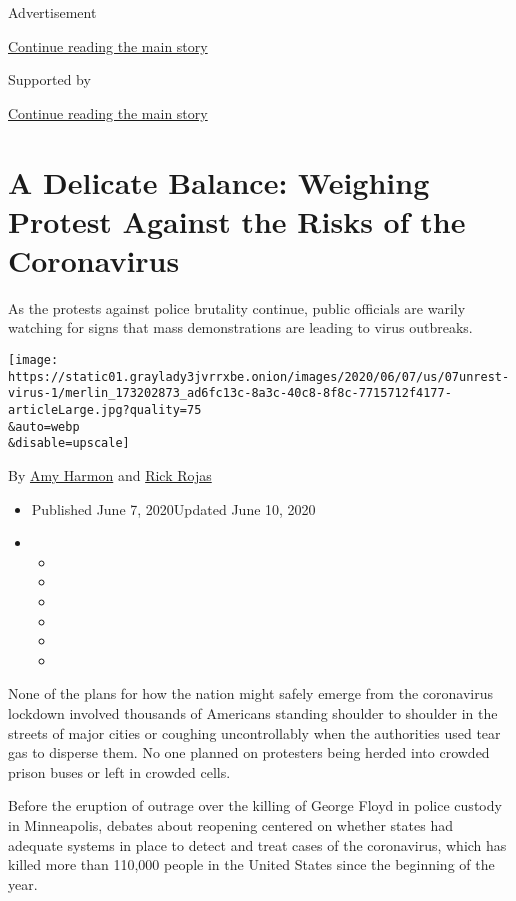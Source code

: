 Advertisement

\protect\hyperlink{after-top}{Continue reading the main story}

Supported by

\protect\hyperlink{after-sponsor}{Continue reading the main story}

\hypertarget{a-delicate-balance-weighing-protest-against-the-risks-of-the-coronavirus}{%
\section{A Delicate Balance: Weighing Protest Against the Risks of the
Coronavirus}\label{a-delicate-balance-weighing-protest-against-the-risks-of-the-coronavirus}}

As the protests against police brutality continue, public officials are
warily watching for signs that mass demonstrations are leading to virus
outbreaks.

\texttt{[image: https://static01.graylady3jvrrxbe.onion/images/2020/06/07/us/07unrest-virus-1/merlin\_173202873\_ad6fc13c-8a3c-40c8-8f8c-7715712f4177-articleLarge.jpg?quality=75\\\&auto=webp\\\&disable=upscale]}

By \href{https://www.nytimes3xbfgragh.onion/by/amy-harmon}{Amy Harmon}
and \href{https://www.nytimes3xbfgragh.onion/by/rick-rojas}{Rick Rojas}

\begin{itemize}
\item
  Published June 7, 2020Updated June 10, 2020
\item
  \begin{itemize}
  \item
  \item
  \item
  \item
  \item
  \item
  \end{itemize}
\end{itemize}

None of the plans for how the nation might safely emerge from the
coronavirus lockdown involved thousands of Americans standing shoulder
to shoulder in the streets of major cities or coughing uncontrollably
when the authorities used tear gas to disperse them. No one planned on
protesters being herded into crowded prison buses or left in crowded
cells.

Before the eruption of outrage over the killing of George Floyd in
police custody in Minneapolis, debates about reopening centered on
whether states had adequate systems in place to detect and treat cases
of the coronavirus, which has killed more than 110,000 people in the
United States since the beginning of the year.

